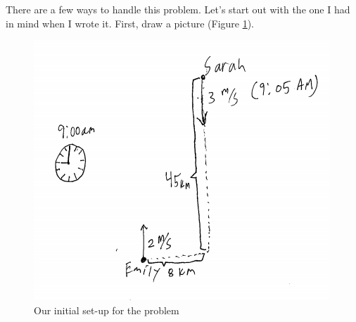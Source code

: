 \documentclass[english]{article}
\theoremstyle{remark}
\theoremstyle{definition}
\begin{document}
There are a few ways to handle this problem. Let's start out with the one I had in mind when I wrote it. First, draw a picture (Figure \ref{setup}).
\begin{figure}[h!]\begin{centering}
	\includegraphics[scale=.75]{fig1}\caption{Our initial set-up for the problem}\label{setup}
\end{centering}\end{figure}
\end{document}
